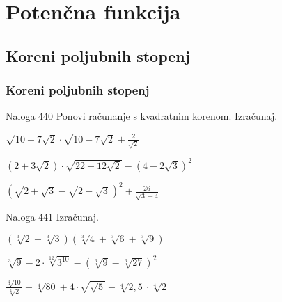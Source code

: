 \section{Potenčna funkcija}

\begin{frame}
    \sectionpage
\end{frame}

\begin{frame}
\end{frame}

    \subsection{Koreni poljubnih stopenj}

        \begin{frame}
            \frametitle{Koreni poljubnih stopenj}
        \end{frame}

        \begin{frame}
            \begin{exampleblock}{Naloga 440}
                Ponovi računanje s kvadratnim korenom. Izračunaj.
                \begin{description}
                    \item<2->[(d)] $\displaystyle\sqrt{10+7\sqrt{2}}\cdot\sqrt{10-7\sqrt{2}}+\frac{2}{\sqrt{2}}$
                    \item<3->[(f)] $\displaystyle\left(2+3\sqrt{2}\right)\cdot\sqrt{22-12\sqrt{2}}-\left(4-2\sqrt{3}\right)^2$
                    \item<4->[(h)] $\displaystyle\left(\sqrt{2+\sqrt{3}}-\sqrt{2-\sqrt{3}}\right)^2+\frac{26}{\sqrt{3}-4} $  
                \end{description}
            \end{exampleblock}
        \end{frame}

        \begin{frame}
            \begin{exampleblock}{Naloga 441}
                Izračunaj.
                \begin{description}
                    \item<2->[(c)] $\displaystyle \left(\sqrt[3]{2}-\sqrt[3]{3}\right)\left(\sqrt[3]{4}+\sqrt[3]{6}+\sqrt[3]{9}\right)$
                    \item<3->[(e)] $\displaystyle \sqrt[3]{9}-2\cdot\sqrt[12]{3^{10}}-\left(\sqrt[6]{9}-\sqrt[6]{27}\right)^2$
                    \item<4->[(h)] $\displaystyle \frac{\sqrt[4]{10}}{\sqrt[4]{2}}-\sqrt[4]{80}+4\cdot\sqrt{\sqrt{5}}-\sqrt[4]{2,5}\cdot\sqrt[4]{2}$   
                \end{description}
            \end{exampleblock}
        \end{frame}

